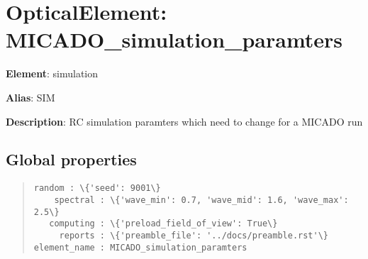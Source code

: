 

\section{OpticalElement: \textquotedbl{}MICADO\_simulation\_paramters\textquotedbl{}%
  \label{opticalelement-micado-simulation-paramters}%
}

\textbf{Element}: simulation

\textbf{Alias}: SIM

\textbf{Description}: RC simulation paramters which need to change for a MICADO run


\subsection{Global properties%
  \label{global-properties}%
}

\begin{quote}
\begin{alltt}
\begin{lstlisting}[frame=single]
      random : \{'seed': 9001\}
    spectral : \{'wave_min': 0.7, 'wave_mid': 1.6, 'wave_max': 2.5\}
   computing : \{'preload_field_of_view': True\}
     reports : \{'preamble_file': '../docs/preamble.rst'\}
element_name : MICADO_simulation_paramters
\end{lstlisting}
\end{alltt}
\end{quote}
